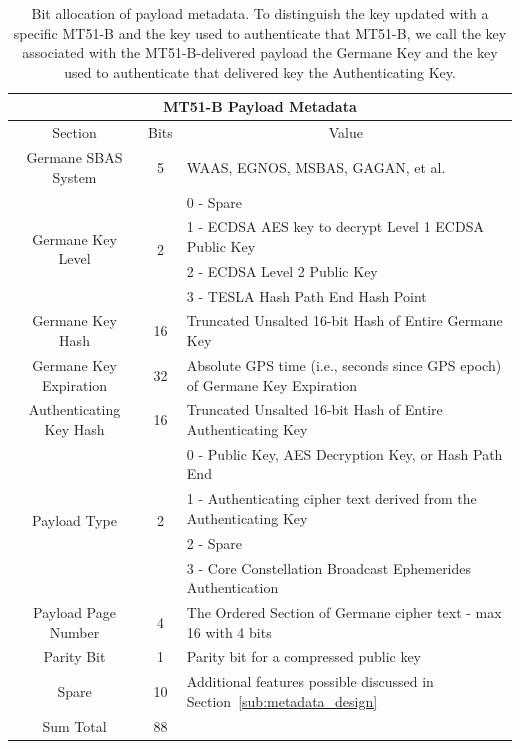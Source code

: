 \documentclass[letterpaper,times]{IONconf/IONconf}
\begin{document}
		\begin{table}%
			\center
			\begin{tabular}{|c|c|l|} \hline
				\multicolumn{3}{|c|}{MT51-B Payload Metadata} \\ \hline
				Section & Bits & \multicolumn{1}{|c|}{Value} \\ \hline
				Germane SBAS System & 5 & WAAS, EGNOS, MSBAS, GAGAN, et al. \\ \hline
				\multirow{4}{*}{Germane Key Level} & \multirow{4}{*}{2} & 0 - Spare \\ 
				& & 1 - ECDSA AES key to decrypt Level 1 ECDSA Public Key \\
				& & 2 - ECDSA Level 2 Public Key \\
				& & 3 - TESLA Hash Path End Hash Point \\ \hline
				Germane Key Hash & 16 & Truncated Unsalted 16-bit Hash of Entire Germane Key \\ \hline
				Germane Key Expiration & 32 & Absolute GPS time (i.e., seconds since GPS epoch) of Germane Key Expiration \\ \hline
				Authenticating Key Hash & 16 & Truncated Unsalted 16-bit Hash of Entire Authenticating Key \\ \hline
				\multirow{4}{*}{Payload Type} & \multirow{4}{*}{2} & 0 - Public Key, AES Decryption Key, or Hash Path End \\
				& & 1 - Authenticating cipher text derived from the Authenticating Key \\ 
				& & 2 - Spare \\ 
				& & 3 - Core Constellation Broadcast Ephemerides Authentication \\ \hline
				Payload Page Number & 4 & The Ordered Section of Germane cipher text - max 16 with 4 bits\\ \hline
				Parity Bit & 1 & Parity bit for a compressed public key \\ \hline
				Spare & 10 & Additional features possible discussed in Section~\ref{sub:metadata_design} \\ \hline
				Sum Total & 88 & \\ \hline
			\end{tabular}
			\caption{Bit allocation of payload metadata. To distinguish the key updated with a specific MT51-B and the key used to authenticate that MT51-B, we call the key associated with the MT51-B-delivered payload the Germane Key and the key used to authenticate that delivered key the Authenticating Key.}
			\label{tab: meta-data}
		\end{table}
\end{document}
